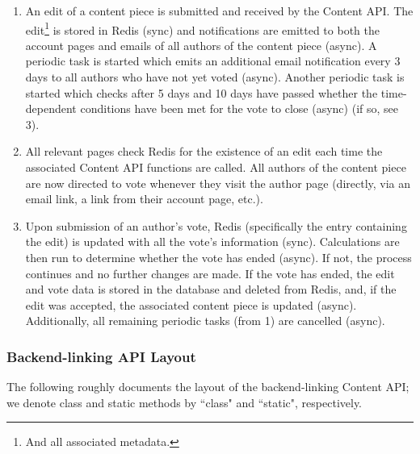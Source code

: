 \documentclass[12pt,letterpaper]{article}
\begin{document}
\begin{enumerate}
\item[1.] An edit of a content piece is submitted and received by the Content API. The edit\footnote{And all associated metadata.} is stored in Redis (sync) and notifications are emitted to both the account pages and emails of all authors of the content piece (async). A periodic task is started which emits an additional email notification every 3 days to all authors who have not yet voted (async). Another periodic task is started which checks after 5 days and 10 days have passed whether the time-dependent conditions have been met for the vote to close (async) (if so, see 3).
\item[2.] All relevant pages check Redis for the existence of an edit each time the associated Content API functions are called. All authors of the content piece are now directed to vote whenever they visit the author page (directly, via an email link, a link from their account page, etc.). 
\item[3.] Upon submission of an author's vote, Redis (specifically the entry containing the edit) is updated with all the vote's information (sync). Calculations are then run to determine whether the vote has ended (async). If not, the process continues and no further changes are made. If the vote has ended, the edit and vote data is stored in the database and deleted from Redis, and, if the edit was accepted, the associated content piece is updated (async). Additionally, all remaining periodic tasks (from 1) are cancelled (async).
\end{enumerate}




\subsubsection{Backend-linking API Layout}

The following roughly documents the layout of the backend-linking Content API; we denote class and static methods by ``class" and ``static", respectively.
\end{document}
